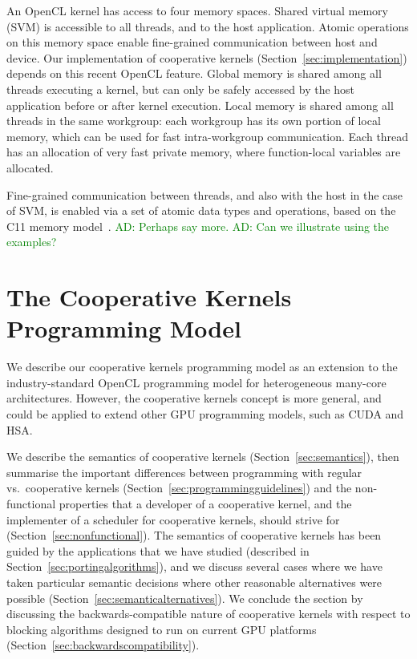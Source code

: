 \documentclass[nocopyrightspace]{sigplanconf-pldi16}
\newcommand{\ADComment}[1]{\textcolor{green}{AD: #1}}
\begin{document}
An OpenCL kernel has access to four memory spaces.  Shared virtual
memory (SVM) is accessible to all threads, and to the host
application.  Atomic operations on this memory space enable
fine-grained communication between host and device.  Our
implementation of cooperative kernels
(Section~\ref{sec:implementation}) depends on this recent OpenCL
feature.  Global memory is shared among all threads executing a
kernel, but can only be safely accessed by the host application before
or after kernel execution.  Local memory is shared among all threads
in the same workgroup: each workgroup has its own portion of local
memory, which can be used for fast intra-workgroup communication.
Each thread has an allocation of very fast private memory, where
function-local variables are allocated.

Fine-grained communication between threads, and also with the host in
the case of SVM, is enabled via a set of atomic data types and
operations, based on the C11 memory model~\cite{...}.
\ADComment{Perhaps say more.}  \ADComment{Can we illustrate using the
  examples?}


\section{The Cooperative Kernels Programming Model}\label{sec:cooperativekernels}

We describe our cooperative kernels programming model as an extension
to the industry-standard OpenCL programming model for heterogeneous
many-core architectures.  However, the cooperative kernels concept is
more general, and could be applied to extend other GPU programming
models, such as CUDA and HSA.

We describe the semantics of cooperative kernels
(Section~\ref{sec:semantics}), then summarise the important
differences between programming with regular vs.\ cooperative kernels
(Section~\ref{sec:programmingguidelines}) and the non-functional
properties that a developer of a cooperative kernel, and the
implementer of a scheduler for cooperative kernels, should strive for
(Section~\ref{sec:nonfunctional}).  The semantics of cooperative
kernels has been guided by the applications that we have studied
(described in Section~\ref{sec:portingalgorithms}), and we discuss several cases where we
have taken particular semantic decisions where other reasonable
alternatives were possible (Section~\ref{sec:semanticalternatives}).
We conclude the section by discussing the backwards-compatible nature
of cooperative kernels with respect to blocking algorithms designed to
run on current GPU platforms
(Section~\ref{sec:backwardscompatibility}).
\end{document}
